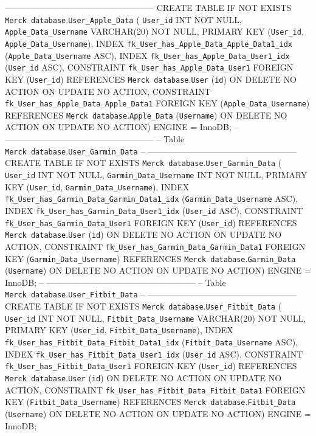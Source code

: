 \documentclass[]{book}
\begin{document}
----------------------------------------------------- CREATE TABLE IF
NOT EXISTS \texttt{Merck\ database}.\texttt{User\_Apple\_Data} (
\texttt{User\_id} INT NOT NULL, \texttt{Apple\_Data\_Username}
VARCHAR(20) NOT NULL, PRIMARY KEY (\texttt{User\_id},
\texttt{Apple\_Data\_Username}), INDEX
\texttt{fk\_User\_has\_Apple\_Data\_Apple\_Data1\_idx}
(\texttt{Apple\_Data\_Username} ASC), INDEX
\texttt{fk\_User\_has\_Apple\_Data\_User1\_idx} (\texttt{User\_id} ASC),
CONSTRAINT \texttt{fk\_User\_has\_Apple\_Data\_User1} FOREIGN KEY
(\texttt{User\_id}) REFERENCES \texttt{Merck\ database}.\texttt{User}
(\texttt{id}) ON DELETE NO ACTION ON UPDATE NO ACTION, CONSTRAINT
\texttt{fk\_User\_has\_Apple\_Data\_Apple\_Data1} FOREIGN KEY
(\texttt{Apple\_Data\_Username}) REFERENCES
\texttt{Merck\ database}.\texttt{Apple\_Data} (\texttt{Username}) ON
DELETE NO ACTION ON UPDATE NO ACTION) ENGINE = InnoDB; --
----------------------------------------------------- -- Table
\texttt{Merck\ database}.\texttt{User\_Garmin\_Data} --
----------------------------------------------------- CREATE TABLE IF
NOT EXISTS \texttt{Merck\ database}.\texttt{User\_Garmin\_Data} (
\texttt{User\_id} INT NOT NULL, \texttt{Garmin\_Data\_Username} INT NOT
NULL, PRIMARY KEY (\texttt{User\_id}, \texttt{Garmin\_Data\_Username}),
INDEX \texttt{fk\_User\_has\_Garmin\_Data\_Garmin\_Data1\_idx}
(\texttt{Garmin\_Data\_Username} ASC), INDEX
\texttt{fk\_User\_has\_Garmin\_Data\_User1\_idx} (\texttt{User\_id}
ASC), CONSTRAINT \texttt{fk\_User\_has\_Garmin\_Data\_User1} FOREIGN KEY
(\texttt{User\_id}) REFERENCES \texttt{Merck\ database}.\texttt{User}
(\texttt{id}) ON DELETE NO ACTION ON UPDATE NO ACTION, CONSTRAINT
\texttt{fk\_User\_has\_Garmin\_Data\_Garmin\_Data1} FOREIGN KEY
(\texttt{Garmin\_Data\_Username}) REFERENCES
\texttt{Merck\ database}.\texttt{Garmin\_Data} (\texttt{Username}) ON
DELETE NO ACTION ON UPDATE NO ACTION) ENGINE = InnoDB; --
----------------------------------------------------- -- Table
\texttt{Merck\ database}.\texttt{User\_Fitbit\_Data} --
----------------------------------------------------- CREATE TABLE IF
NOT EXISTS \texttt{Merck\ database}.\texttt{User\_Fitbit\_Data} (
\texttt{User\_id} INT NOT NULL, \texttt{Fitbit\_Data\_Username}
VARCHAR(20) NOT NULL, PRIMARY KEY (\texttt{User\_id},
\texttt{Fitbit\_Data\_Username}), INDEX
\texttt{fk\_User\_has\_Fitbit\_Data\_Fitbit\_Data1\_idx}
(\texttt{Fitbit\_Data\_Username} ASC), INDEX
\texttt{fk\_User\_has\_Fitbit\_Data\_User1\_idx} (\texttt{User\_id}
ASC), CONSTRAINT \texttt{fk\_User\_has\_Fitbit\_Data\_User1} FOREIGN KEY
(\texttt{User\_id}) REFERENCES \texttt{Merck\ database}.\texttt{User}
(\texttt{id}) ON DELETE NO ACTION ON UPDATE NO ACTION, CONSTRAINT
\texttt{fk\_User\_has\_Fitbit\_Data\_Fitbit\_Data1} FOREIGN KEY
(\texttt{Fitbit\_Data\_Username}) REFERENCES
\texttt{Merck\ database}.\texttt{Fitbit\_Data} (\texttt{Username}) ON
DELETE NO ACTION ON UPDATE NO ACTION) ENGINE = InnoDB;
\end{document}
